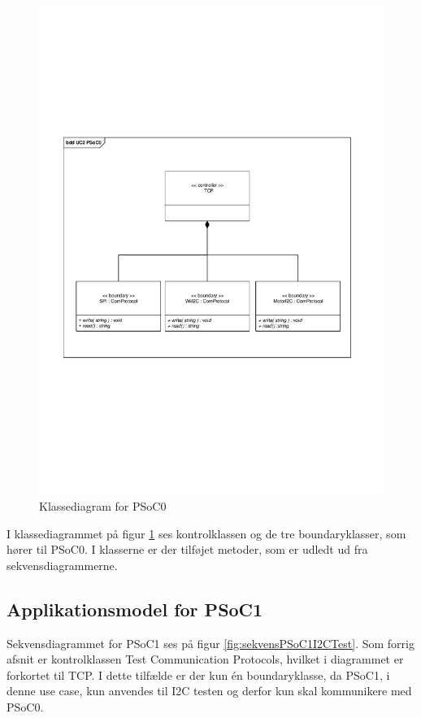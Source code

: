 \begin{figure}[H]
	\centering
	\includegraphics[width=\textwidth]{Systemarkitektur/images/klassediagramPSoC0}
	\caption{Klassediagram for PSoC0}
	\label{fig:klassePSoC0}
\end{figure}

I klassediagrammet på figur \ref{fig:klassePSoC0} ses kontrolklassen og de tre boundaryklasser, som hører til PSoC0. I klasserne er der tilføjet metoder, som er udledt ud fra sekvensdiagrammerne. 

\subsection{Applikationsmodel for PSoC1}
Sekvensdiagrammet for PSoC1 ses på figur \ref{fig:sekvensPSoC1I2CTest}. Som forrig afsnit er kontrolklassen Test Communication Protocols, hvilket i diagrammet er forkortet til TCP. I dette tilfælde er der kun én boundaryklasse, da PSoC1, i denne use case, kun anvendes til I2C testen og derfor kun skal kommunikere med PSoC0. 

